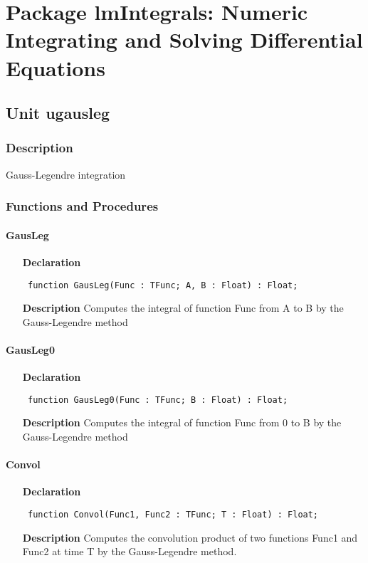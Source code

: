 \documentclass[12pt,a4paper,oneside]{report}
\newcommand{\declarationitem}[1]{\textbf{#1}}
\newcommand{\descriptiontitle}[1]{\textbf{#1}}
\newcommand{\code}[1]{\texttt{#1}}
\begin{document}
\chapter[Package lmIntegrals]{Package lmIntegrals: Numeric Integrating and Solving Differential Equations}\label{package-lmIntegrals}
\section{Unit ugausleg}
\label{ugausleg}
\subsection{Description}
Gauss-Legendre integration
\subsection{Functions and Procedures}
\subsubsection{GausLeg}
\label{ugausleg-GausLeg}
\begin{itemize}\item[\declarationitem{Declaration}\hfill]
	\begin{flushleft}
		\code{
			function GausLeg(Func : TFunc; A, B : Float) : Float;}
		
	\end{flushleft}
	
	\par
	\item[\descriptiontitle{Description}]
	Computes the integral of function Func from A to B
	by the Gauss-Legendre method
\end{itemize}
\subsubsection{GausLeg0}
\label{ugausleg-GausLeg0}
\begin{itemize}\item[\declarationitem{Declaration}\hfill]
	\begin{flushleft}
		\code{
			function GausLeg0(Func : TFunc; B : Float) : Float;}
	\end{flushleft}
	\item[\descriptiontitle{Description}]
	Computes the integral of function Func from 0 to B
	by the Gauss-Legendre method
\end{itemize}
\subsubsection{Convol}
\label{ugausleg-Convol}
\begin{itemize}\item[\declarationitem{Declaration}\hfill]
	\begin{flushleft}
		\code{
			function Convol(Func1, Func2 : TFunc; T : Float) : Float;}
	\end{flushleft}
	\item[\descriptiontitle{Description}]
	Computes the convolution product of two functions Func1 and Func2 at time T by the Gauss-Legendre method.
\end{itemize}
\end{document}

